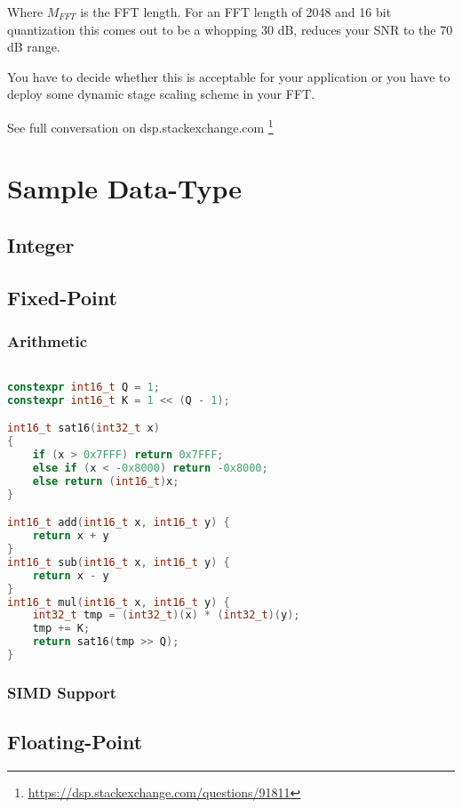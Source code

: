 \documentclass{report}
\begin{document}
Where $M_{FFT}$ is the FFT length. For an FFT length of 2048 and 16 bit
quantization this comes out to be a whopping 30 dB, reduces your SNR to the
70 dB range.

You have to decide whether this is acceptable for your application or you have
to deploy some dynamic stage scaling scheme in your FFT.

See full conversation on dsp.stackexchange.com
\footnote{\url{https://dsp.stackexchange.com/questions/91811}}

\chapter{Sample Data-Type}

\section{Integer}

\section{Fixed-Point}

\subsection{Arithmetic}

\begin{lstlisting}[language=C++]

constexpr int16_t Q = 1;
constexpr int16_t K = 1 << (Q - 1);

int16_t sat16(int32_t x)
{
	if (x > 0x7FFF) return 0x7FFF;
	else if (x < -0x8000) return -0x8000;
	else return (int16_t)x;
}

int16_t add(int16_t x, int16_t y) {
    return x + y
}
int16_t sub(int16_t x, int16_t y) {
    return x - y
}
int16_t mul(int16_t x, int16_t y) {
    int32_t tmp = (int32_t)(x) * (int32_t)(y);
    tmp += K;
    return sat16(tmp >> Q);
}
\end{lstlisting}

\subsection{SIMD Support}

\section{Floating-Point}
\end{document}
